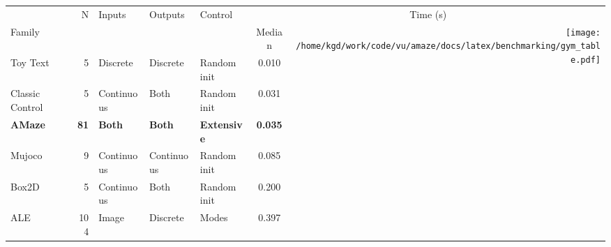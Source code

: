 \documentclass{standalone}
\newlength{\img}
\begin{document}
\begin{tabular}{lrlllc@{}r@{}}
\toprule
 &\multirow{2}{*}{ N }&\multirow{2}{*}{ Inputs }&\multirow{2}{*}{ Outputs }&\multirow{2}{*}{ Control }& \multicolumn{2}{c}{Time (s)} \\ 
\cmidrule(lr){6-7}
Family &  &  &  &  & Median & \multirow{6}{*}{\texttt{[image: /home/kgd/work/code/vu/amaze/docs/latex/benchmarking/gym\_table.pdf]}} \\
\cmidrule(r){1-6}
Toy Text & 5 & Discrete & Discrete & Random init & 0.010 \\
Classic Control & 5 & Continuous & Both & Random init & 0.031 \\
\textbf{AMaze} & \textbf{81} & \textbf{Both} & \textbf{Both} & \textbf{Extensive} & \textbf{0.035 }\\
Mujoco & 9 & Continuous & Continuous & Random init & 0.085 \\
Box2D & 5 & Continuous & Both & Random init & 0.200 \\
ALE & 104 & Image & Discrete & Modes & 0.397 \\
\bottomrule
\end{tabular}
\end{document}
